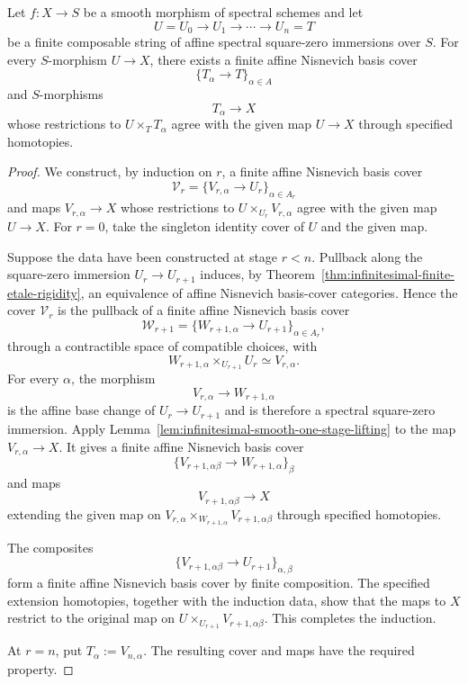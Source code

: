 \begin{lemma}
\label{lem:infinitesimal-smooth-finite-stage-lifting}
Let $f:X\to S$ be a smooth morphism of spectral schemes and let
\[
    U=U_0\longrightarrow U_1\longrightarrow\cdots\longrightarrow U_n=T
\]
be a finite composable string of affine spectral square-zero immersions over
$S$.  For every $S$-morphism
$U\to X$, there exists a finite affine Nisnevich basis cover
\[
    \{T_\alpha\to T\}_{\alpha\in A}
\]
and $S$-morphisms
\[
    T_\alpha\longrightarrow X
\]
whose restrictions to $U\times_TT_\alpha$ agree with the given map
$U\to X$ through specified homotopies.
\end{lemma}

\begin{proof}
We construct, by induction on $r$, a finite affine Nisnevich basis cover
\[
    \mathcal V_r=\{V_{r,\alpha}\to U_r\}_{\alpha\in A_r}
\]
and maps $V_{r,\alpha}\to X$ whose restrictions to
$U\times_{U_r}V_{r,\alpha}$ agree with the given map $U\to X$.  For $r=0$,
take the singleton identity cover of $U$ and the given map.

Suppose the data have been constructed at stage $r<n$.  Pullback along the
square-zero immersion $U_r\to U_{r+1}$ induces, by
Theorem~\ref{thm:infinitesimal-finite-etale-rigidity}, an equivalence of
affine Nisnevich basis-cover categories.  Hence the cover
$\mathcal V_r$ is the pullback of a finite affine Nisnevich basis cover
\[
    \mathcal W_{r+1}
    =
    \{W_{r+1,\alpha}\to U_{r+1}\}_{\alpha\in A_r},
\]
through a contractible space of compatible choices, with
\[
    W_{r+1,\alpha}\times_{U_{r+1}}U_r
    \simeq
    V_{r,\alpha}.
\]
For every $\alpha$, the morphism
\[
    V_{r,\alpha}\longrightarrow W_{r+1,\alpha}
\]
is the affine base change of $U_r\to U_{r+1}$ and is therefore a spectral
square-zero immersion.  Apply
Lemma~\ref{lem:infinitesimal-smooth-one-stage-lifting} to the map
$V_{r,\alpha}\to X$.  It gives a finite affine Nisnevich basis cover
\[
    \{V_{r+1,\alpha\beta}\to W_{r+1,\alpha}\}_{\beta}
\]
and maps
\[
    V_{r+1,\alpha\beta}\longrightarrow X
\]
extending the given map on
$V_{r,\alpha}\times_{W_{r+1,\alpha}}V_{r+1,\alpha\beta}$ through specified
homotopies.

The composites
\[
    \{V_{r+1,\alpha\beta}\to U_{r+1}\}_{\alpha,\beta}
\]
form a finite affine Nisnevich basis cover by finite composition.  The
specified extension homotopies, together with the induction data, show that
the maps to $X$ restrict to the original map on
$U\times_{U_{r+1}}V_{r+1,\alpha\beta}$.  This completes the induction.

At $r=n$, put $T_\alpha:=V_{n,\alpha}$.  The resulting cover and maps have
the required property.
\end{proof}

